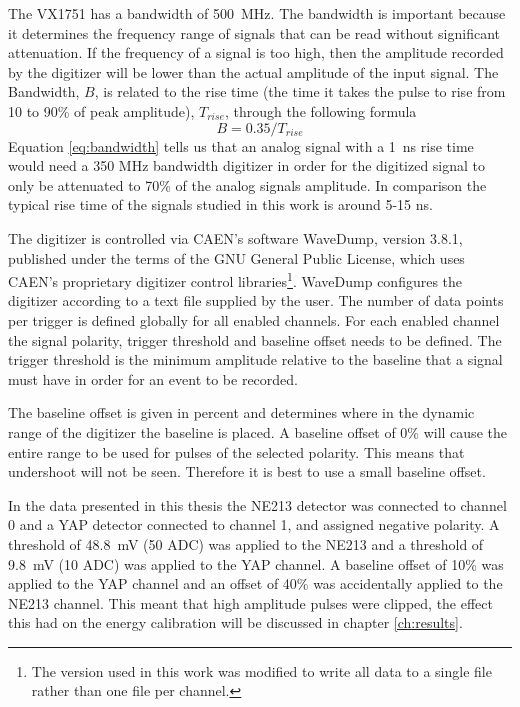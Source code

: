 \documentclass[main.tex]{subfiles}
\begin{document}
The VX1751 has a bandwidth of \SI{500}{\mega\hertz}. The bandwidth is important because it determines the frequency range of signals that can be read without significant attenuation. If the frequency of a signal is too high, then the amplitude recorded by the digitizer will be lower than the actual amplitude of the input signal. The Bandwidth, $B$, is related to the rise time (the time it takes the pulse to rise from 10 to 90\% of peak amplitude), $T_{rise}$, through the following formula\cite[p.354]{Leo}
\begin{equation}
\label{eq:bandwidth}
B=0.35/T_{rise}
\end{equation}
Equation \ref{eq:bandwidth} tells us that an analog signal with a \SI{1}{ns} rise time would need a 350 MHz bandwidth digitizer in order for the digitized signal to only be attenuated to 70\% of the analog signals amplitude. In comparison the typical rise time of the signals studied in this work is around 5-15 ns.

The digitizer is controlled via CAEN's software WaveDump, version 3.8.1, published under the terms of the GNU General Public License\cite{WaveDump}, which uses CAEN's proprietary digitizer control libraries\footnote{The version used in this work was modified to write all data to a single file rather than one file per channel.}. WaveDump configures the digitizer according to a text file supplied by the user. The number of data points per trigger is defined globally for all enabled channels. For each enabled channel the signal polarity, trigger threshold and baseline offset needs to be defined. The trigger threshold is the minimum amplitude relative to the baseline that a signal must have in order for an event to be recorded. 

The baseline offset is given in percent and determines where in the dynamic range of the digitizer the baseline is placed. A baseline offset of 0\% will cause the entire range to be used for pulses of the selected polarity. This means that undershoot will not be seen. Therefore it is best to use a small baseline offset.

In the data presented in this thesis the NE213 detector was connected to channel 0 and a YAP detector connected to channel 1, and assigned negative polarity. A threshold of \SI{48.8}{mV} (50 ADC) was applied to the NE213 and a threshold of \SI{9.8}{mV} (10 ADC) was applied to the YAP channel. A baseline offset of 10\% was applied to the YAP channel and an offset of 40\% was accidentally applied to the NE213 channel. This meant that high amplitude pulses were clipped, the effect this had on the energy calibration will be discussed in chapter \ref{ch:results}.
\end{document}
